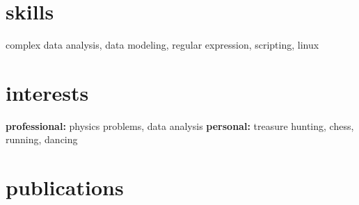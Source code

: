 \documentclass[]{friggeri-cv} %
\begin{document}
%
%
\section{skills}
complex data analysis, data modeling, regular expression, scripting, linux

\section{interests}

\textbf{professional:} physics problems, data analysis \textbf{personal:} treasure hunting, chess, running, dancing



\section{publications}
\nocite{*}



%
%
%

%
%
\end{document}
